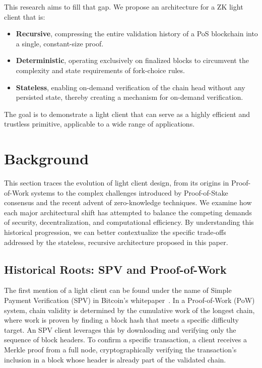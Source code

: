 \documentclass[runningheads]{llncs}
\begin{document}
This research aims to fill that gap. We propose an architecture for a ZK light client that is:
\begin{itemize}
    \item \textbf{Recursive}, compressing the entire validation history of a PoS blockchain into a single, constant-size proof.
    \item \textbf{Deterministic}, operating exclusively on finalized blocks to circumvent the complexity and state requirements of fork-choice rules.
    \item \textbf{Stateless}, enabling on-demand verification of the chain head without any persisted state, thereby creating a mechanism for on-demand verification.
\end{itemize}

The goal is to demonstrate a light client that can serve as a highly efficient and trustless primitive, applicable to a wide range of applications.

\section{Background}

This section traces the evolution of light client design, from its origins in Proof-of-Work systems to the complex challenges introduced by Proof-of-Stake consensus and the recent advent of zero-knowledge techniques. We examine how each major architectural shift has attempted to balance the competing demands of security, decentralization, and computational efficiency. By understanding this historical progression, we can better contextualize the specific trade-offs addressed by the stateless, recursive architecture proposed in this paper.

\subsection{Historical Roots: SPV and Proof-of-Work}
The first mention of a light client can be found under the name of Simple Payment Verification (SPV) in Bitcoin's whitepaper~\cite{Nakamoto2008Bitcoin}. In a Proof-of-Work (PoW) system, chain validity is determined by the cumulative work of the longest chain, where work is proven by finding a block hash that meets a specific difficulty target. An SPV client leverages this by downloading and verifying only the sequence of block headers. To confirm a specific transaction, a client receives a Merkle proof from a full node, cryptographically verifying the transaction's inclusion in a block whose header is already part of the validated chain.
\end{document}
